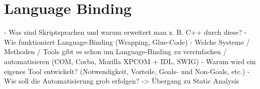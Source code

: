 \chapter{Language Binding}

  - Was sind Skriptsprachen und warum erweitert man z. B. C++ durch diese?
  - Wie funktioniert Language-Binding (Wrapping, Glue-Code)
  - Welche Systeme / Methoden / Tools gibt es schon um Language-Binding zu vereinfachen / automatisieren (COM, Corba, Mozilla XPCOM + IDL, SWIG)
  - Warum wird ein eigenes Tool entwickelt? (Notwendigkeit, Vorteile, Goals- und Non-Goals, etc.)
  - Wie soll die Automatisierung grob erfolgen? -> Übergang zu Static Analysis